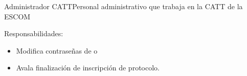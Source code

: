 \begin{actor}{Administrador CATT}{Personal administrativo que trabaja en la CATT de la ESCOM} 
	\item[Responsabilidades:] \hspace{1pt}
	\begin{itemize}
		\item  Modifica contraseñas de  o 
		\item  Avala finalización de inscripción de protocolo.
	\end{itemize}
\end{actor}